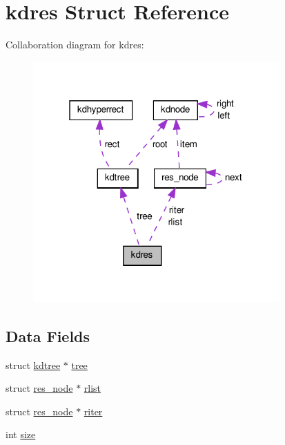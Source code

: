 \hypertarget{a00010}{\section{kdres \-Struct \-Reference}
\label{d7/dec/a00010}
}


\-Collaboration diagram for kdres\-:\nopagebreak
\begin{figure}[H]
\begin{center}
\leavevmode
\includegraphics[width=268pt]{d3/de7/a00039}
\end{center}
\end{figure}
\subsection*{\-Data \-Fields}
\begin{DoxyCompactItemize}
\item 
struct \hyperlink{a00011}{kdtree} $\ast$ \hyperlink{a00010_ae75a12d07763fe14039f5123e1e3d377_ae75a12d07763fe14039f5123e1e3d377}{tree}
\item 
struct \hyperlink{a00012}{res\-\_\-node} $\ast$ \hyperlink{a00010_a1424ef73f7eb289a18a4ce40ac38dedb_a1424ef73f7eb289a18a4ce40ac38dedb}{rlist}
\item 
struct \hyperlink{a00012}{res\-\_\-node} $\ast$ \hyperlink{a00010_a10ec50599e37f9fcb520b8fc6d44728b_a10ec50599e37f9fcb520b8fc6d44728b}{riter}
\item 
int \hyperlink{a00010_a439227feff9d7f55384e8780cfc2eb82_a439227feff9d7f55384e8780cfc2eb82}{size}
\end{DoxyCompactItemize}


